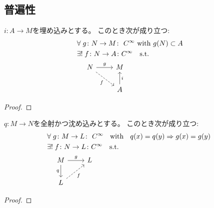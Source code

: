 \documentclass[report]{jlreq}
\begin{document}
\begin{example}[単射はめ込みだが埋め込みでない例]
\end{example}

\subsection{普遍性}

\begin{theorem}[埋め込みの普遍性]
    $i \colon A \to M$を埋め込みとする。
    このとき次が成り立つ:
    \begin{alignat}{1}
        &\forall \; g \colon N \to M
            \colon \text{ {\smooth} with $g(N) \subset A$} \\
        &\exists! \; f \colon N \to A
            \colon \smooth
            \quad \text{s.t.} \quad \\
        &\quad \begin{tikzcd}[ampersand replacement=\&]
            N \ar[dashed]{rd}[swap]{f} \ar{r}{g} \& M \\
            \& A \ar{u}[swap]{i}
        \end{tikzcd}
    \end{alignat}
\end{theorem}

\begin{proof}
    \TODO{}
\end{proof}

\begin{theorem}[沈め込みの普遍性]
    $q \colon M \to N$を全射かつ沈め込みとする。
    このとき次が成り立つ:
    \begin{alignat}{1}
        &\forall \; g \colon M \to L
            \colon \text{
                {\smooth}
                \; with \;
                $q(x) = q(y) \Rightarrow g(x) = g(y)$
            } \\
        &\exists! \; f \colon N \to L
            \colon \smooth
            \quad \text{s.t.} \quad \\
        &\quad \begin{tikzcd}[ampersand replacement=\&]
            M \ar{d}[swap]{q} \ar{r}{g} \& L \\
            L \ar[dashed]{ru}[swap]{f}
        \end{tikzcd}
    \end{alignat}
\end{theorem}

\begin{proof}
    \TODO{}
\end{proof}
\end{document}
